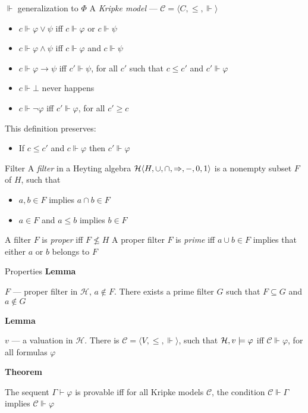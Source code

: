 \documentclass[sans]{beamer}
\begin{document}
\begin{frame}{$\Vdash$ generalization to $\Phi$}
  A \emph{Kripke model} --- $\mathcal{C} = \langle C,\leq,{\Vdash} \rangle$
  \begin{itemize}
    \item $c \Vdash \varphi \vee \psi$ iff $c \Vdash \varphi$ or $c \Vdash \psi$
    \item $c \Vdash \varphi \wedge \psi$ iff $c \Vdash \varphi$ and $c \Vdash \psi$
    \item $c \Vdash \varphi \to \psi$ iff $c' \Vdash \psi$, for all $c'$ such that $c \leq c'$ and $c' \Vdash \varphi$
    \item $c \Vdash \bot$ never happens

    \vfill
    \pause
    \item $c \Vdash \lnot \varphi$ iff $c' \Vdash \varphi$, for all $c' \geq c$
  \end{itemize}

  \pause
  \vfill
  This definition preserves:
  \begin{itemize}
      \item If $c \leq c'$ and $c \Vdash \varphi$ then $c' \Vdash \varphi$
  \end{itemize}
\end{frame}

\begin{frame}{Filter}
  A \emph{filter} in a Heyting algebra $\mathcal{H} \langle H, \cup, \cap, \Rightarrow, -, 0, 1\rangle$ is a nonempty subset $F$ of $H$, such that
  \begin{itemize}
    \item $a, b \in F$ implies $a \cap b \in F$
    \item $a \in F$ and $a \leq b$ implies $b \in F$
  \end{itemize}

  \vfill
  A filter $F$ is \emph{proper} iff $F \nleq H$
  \vfill
  A proper filter $F$ is \emph{prime} iff $a \cup b \in F$ implies that either $a$ or $b$ belongs to $F$
\end{frame}

\begin{frame}{Properties}
  \textbf{Lemma}

  $F$ --- proper filter in $\mathcal{H}$, $a \notin F$. There exists a prime filter $G$ such that $F \subseteq G$ and $a \notin G$
  \vfill

  \pause
  \textbf{Lemma}

  $v$ --- a valuation in $\mathcal{H}$. There is $\mathcal{C} = \langle V, \leq, \Vdash \rangle$,
  such that $\mathcal{H}, v \models \varphi$ iff $\mathcal{C} \Vdash \varphi$, for all formulas $\varphi$
  
  \vfill

  \pause
  \textbf{Theorem}

  The sequent $\Gamma \vdash \varphi$ is provable iff for all Kripke models $\mathcal{C}$, the condition
  $\mathcal{C} \Vdash \Gamma$ implies $\mathcal{C} \Vdash \varphi$

\end{frame}
\end{document}
